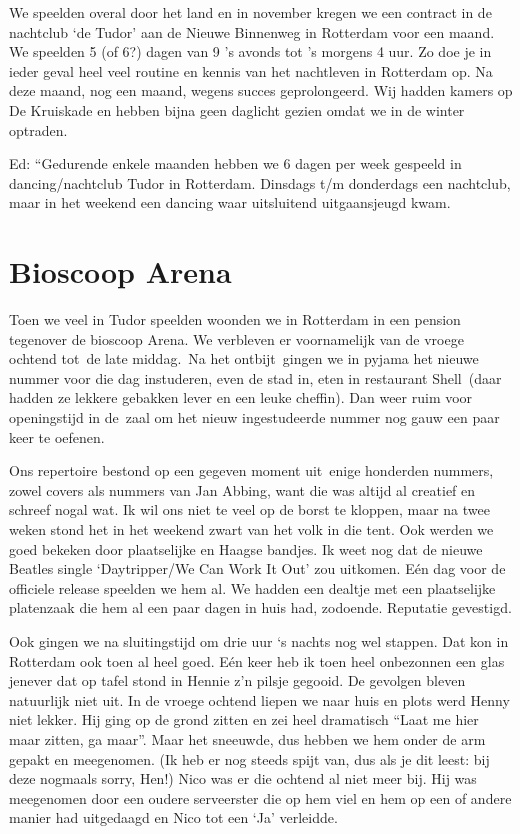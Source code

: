 \documentclass[10pt,twoside,openright]{memoir}
\begin{document}
We speelden overal door het land en in november kregen we een contract in de nachtclub ‘de Tudor’ aan de Nieuwe Binnenweg in Rotterdam voor een maand. We speelden 5 (of 6?) dagen van 9 ’s avonds tot ’s morgens 4 uur. Zo doe je in ieder geval heel veel routine en kennis van het nachtleven in Rotterdam op. Na deze maand, nog een maand, wegens succes geprolongeerd. Wij hadden kamers op De Kruiskade en hebben bijna geen daglicht gezien omdat we in de winter optraden. 

Ed: “Gedurende enkele maanden hebben we 6 dagen per week gespeeld in dancing/nachtclub Tudor in Rotterdam. Dinsdags t/m donderdags een nachtclub, maar in het weekend een dancing waar uitsluitend uitgaansjeugd kwam. 

\chapter{Bioscoop Arena} %
\label{cha:arena}

Toen we veel in Tudor speelden woonden we in Rotterdam in een pension tegenover de bioscoop Arena. We verbleven er voornamelijk van de vroege ochtend tot de late middag. Na het ontbijt gingen we in pyjama het nieuwe nummer voor die dag instuderen, even de stad in, eten in restaurant Shell (daar hadden ze lekkere gebakken lever en een leuke cheffin). Dan weer ruim voor openingstijd in de zaal om het nieuw ingestudeerde nummer nog gauw een paar keer te oefenen. 

Ons repertoire bestond op een gegeven moment uit enige honderden nummers, zowel covers als nummers van Jan Abbing, want die was altijd al creatief en schreef nogal wat. Ik wil ons niet te veel op de borst te kloppen, maar na twee weken stond het in het weekend zwart van het volk in die tent. Ook werden we goed bekeken door plaatselijke en Haagse bandjes. Ik weet nog dat de nieuwe Beatles single `Daytripper/We Can Work It Out' zou uitkomen. Eén dag voor de officiele release speelden we hem al. We hadden een dealtje met een plaatselijke platenzaak die hem al een paar dagen in huis had, zodoende. Reputatie gevestigd. 

Ook gingen we na sluitingstijd om drie uur `s nachts nog wel stappen. Dat kon in Rotterdam ook toen al heel goed. Eén keer heb ik toen heel onbezonnen een glas jenever dat op tafel stond in Hennie z'n pilsje gegooid. De gevolgen bleven natuurlijk niet uit. In de vroege ochtend liepen we naar huis en plots werd Henny niet lekker. Hij ging op de grond zitten en zei heel dramatisch ``Laat me hier maar zitten, ga maar''. Maar het sneeuwde, dus hebben we hem onder de arm gepakt en meegenomen. (Ik heb er nog steeds spijt van, dus als je dit leest: bij deze nogmaals sorry, Hen!) Nico was er die ochtend al niet meer bij. Hij was meegenomen door een oudere serveerster die op hem viel en hem op een of andere manier had uitgedaagd en Nico tot een `Ja' verleidde.
\end{document}
